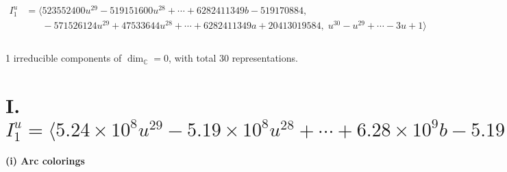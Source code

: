 \documentclass[1p]{elsarticle_modified}
\theoremstyle{definition}
\begin{document}
\begin{align*}
I^u_{1}&=\langle 
523552400 u^{29}-519151600 u^{28}+\cdots+6282411349 b-519170884,\\
\phantom{I^u_{1}}&\phantom{= \langle  }-571526124 u^{29}+47533644 u^{28}+\cdots+6282411349 a+20413019584,\;u^{30}- u^{29}+\cdots-3 u+1\rangle \\
\\
\end{align*}
\raggedright * 1 irreducible components of $\dim_{\mathbb{C}}=0$, with total 30 representations.\\
\newpage
\renewcommand{\arraystretch}{1}
\centering \section*{I. $I^u_{1}= \langle 5.24\times10^{8} u^{29}-5.19\times10^{8} u^{28}+\cdots+6.28\times10^{9} b-5.19\times10^{8},\;-5.72\times10^{8} u^{29}+4.75\times10^{7} u^{28}+\cdots+6.28\times10^{9} a+2.04\times10^{10},\;u^{30}- u^{29}+\cdots-3 u+1 \rangle$}
\flushleft \textbf{(i) Arc colorings}\\
\end{document}
